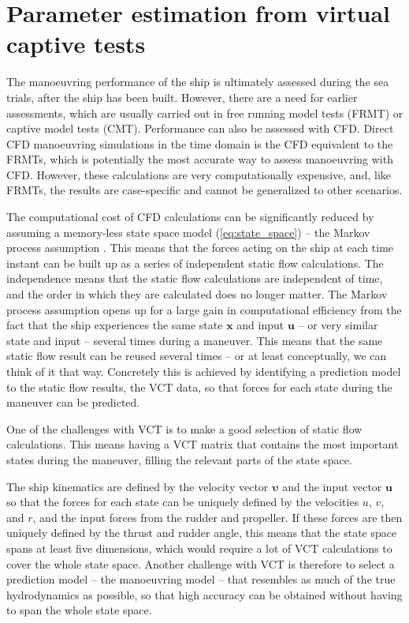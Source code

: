 \section{Parameter estimation from virtual captive tests} \label{sec:VCT}
The manoeuvring performance of the ship is ultimately assessed during the sea trials, after the ship has been built. However, there are a need for earlier assessments, which are usually carried out in free running model tests (FRMT) or captive model tests (CMT). Performance can also be assessed with CFD. Direct CFD manoeuvring simulations in the time domain \cite{elmoctarRANSBasedSimulatedShip2014} is the CFD equivalent to the FRMTs, which is potentially the most accurate way to assess manoeuvring with CFD. However, these calculations are very computationally expensive, and, like FRMTs, the results are case-specific and cannot be generalized to other scenarios. 

The computational cost of CFD calculations can be significantly reduced by assuming a memory-less state space model (\autoref{eq:state_space}) -- the Markov process assumption \cite{yoonIdentificationHydrodynamicCoefficients2003}. This means that the forces acting on the ship at each time instant can be built up as a series of independent static flow calculations. 
The independence means that the static flow calculations are independent of time, and the order in which they are calculated does no longer matter. The Markov process assumption opens up for a large gain in computational efficiency from the fact that the ship experiences the same state $\mathbf{x}$ and input $\mathbf{u}$ -- or very similar state and input -- several times during a maneuver. This means that the same static flow result can be reused several times -- or at least conceptually, we can think of it that way. Concretely this is achieved by identifying a prediction model to the static flow results, the VCT data, so that forces for each state during the maneuver can be predicted. 

One of the challenges with VCT is to make a good selection of static flow calculations. This means having a VCT matrix that contains the most important states during the maneuver, filling the relevant parts of the state space.  

The ship kinematics are defined by the velocity vector $\pmb{\bm{\upsilon}}$ and the input vector $\mathbf{u}$ so that the forces for each state can be uniquely defined by the velocities $u$, $v$, and $r$, and the input forces from the rudder and propeller. If these forces are then uniquely defined by the thrust and rudder angle, this means that the state space spans at least five dimensions, which would require a lot of VCT calculations to cover the whole state space.
Another challenge with VCT is therefore to select a prediction model -- the manoeuvring model -- that resembles as much of the true hydrodynamics as possible, so that high accuracy can be obtained without having to span the whole state space.  

